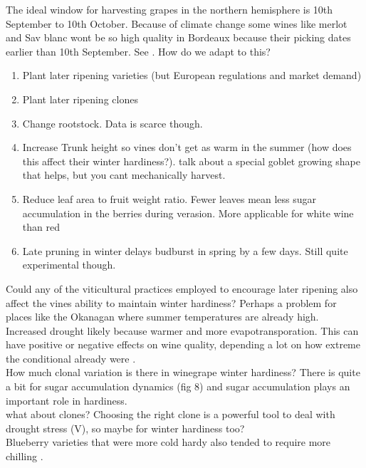 \documentclass[11pt,letter]{article}
\begin{document}
The ideal window for harvesting grapes in the northern hemisphere is 10th September to 10th October. Because of climate change some wines like merlot and Sav blanc wont be so high quality in Bordeaux because their picking dates earlier than 10th September. See \cite{VanLeeuwen2019}. How do we adapt to this?
\begin{enumerate} 
\item Plant later ripening varieties (but European regulations and market demand)
\item Plant later ripening clones
\item Change rootstock. Data is scarce though.		
\item Increase Trunk height so vines don't get as warm in the summer (how does this affect their winter hardiness?). \cite{VanLeeuwen2019,VanLeeuwen2017} talk about a special goblet growing shape that helps, but you cant mechanically harvest.
\item Reduce leaf area to fruit weight ratio. Fewer leaves mean less sugar accumulation in the 	berries during verasion. More applicable for white wine than red
\item Late pruning in winter delays budburst in spring by a few days. Still quite experimental 	though. 
\end{enumerate}

Could any of the viticultural practices employed to encourage later ripening also affect the vines ability to maintain winter hardiness? Perhaps a problem for places like the Okanagan where summer temperatures are already high. \\

Increased drought likely because warmer and more evapotransporation. This can have positive or negative effects on wine quality, depending a lot on how extreme the conditional already were \citep{VanLeeuwen2019}. \\

How much clonal variation is there in winegrape winter hardiness? There is quite a bit for sugar accumulation dynamics \citep{VanLeeuwen2019} (fig 8) and sugar accumulation plays an important role in hardiness.  \\

what about clones? Choosing the right clone is a powerful tool to deal with drought stress (V), so maybe for winter hardiness too?\\

Blueberry varieties that were more cold hardy also tended to require more chilling \citep{Arora2004}.\\
\end{document}
